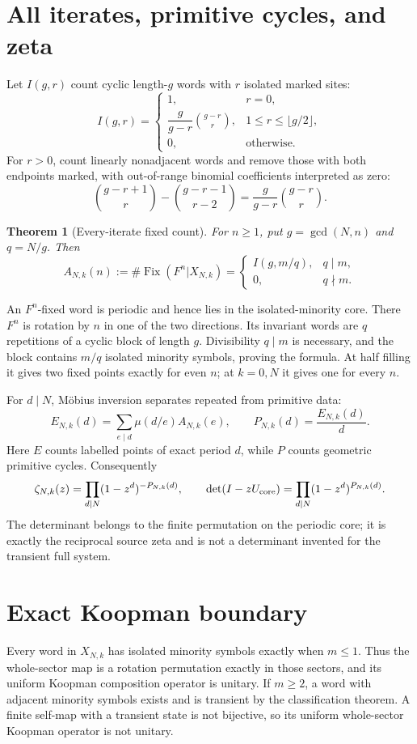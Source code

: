 \documentclass[10pt]{article}
\newtheorem{theorem}{Theorem}
\begin{document}
\section{All iterates, primitive cycles, and zeta}
Let $I(g,r)$ count cyclic length-$g$ words with $r$ isolated marked sites:
\[
I(g,r)=
\begin{cases}
1,&r=0,\\[1mm]
\dfrac{g}{g-r}\binom{g-r}{r},&1\le r\le\lfloor g/2\rfloor,\\[1mm]
0,&\text{otherwise}.
\end{cases}
\]
For $r>0$, count linearly nonadjacent words and remove those with both
endpoints marked, with out-of-range binomial coefficients interpreted as zero:
\[
\binom{g-r+1}{r}-\binom{g-r-1}{r-2}
=\frac{g}{g-r}\binom{g-r}{r}.
\]

\begin{theorem}[Every-iterate fixed count]
For $n\ge1$, put $g=\gcd(N,n)$ and $q=N/g$. Then
\[
A_{N,k}(n):=\#\operatorname{Fix}(F^n|X_{N,k})=
\begin{cases}
I(g,m/q),&q\mid m,\\
0,&q\nmid m.
\end{cases}
\]
\end{theorem}
An $F^n$-fixed word is periodic and hence lies in the isolated-minority core.
There $F^n$ is rotation by $n$ in one of the two directions. Its invariant
words are $q$ repetitions of a cyclic block of length $g$. Divisibility
$q\mid m$ is necessary, and the block contains $m/q$ isolated minority
symbols, proving the formula. At half filling it gives two fixed points
exactly for even $n$; at $k=0,N$ it gives one for every $n$.

For $d\mid N$, Möbius inversion separates repeated from primitive data:
\[
E_{N,k}(d)=\sum_{e\mid d}\mu(d/e)A_{N,k}(e),\qquad
P_{N,k}(d)=\frac{E_{N,k}(d)}d.
\]
Here $E$ counts labelled points of exact period $d$, while $P$ counts
geometric primitive cycles. Consequently
\[
\zeta_{N,k}(z)=\prod_{d\mid N}(1-z^d)^{-P_{N,k}(d)},\qquad
\det(I-zU_{\rm core})=\prod_{d\mid N}(1-z^d)^{P_{N,k}(d)}.
\]
The determinant belongs to the finite permutation on the periodic core; it
is exactly the reciprocal source zeta and is not a determinant invented for
the transient full system.

\section{Exact Koopman boundary}
Every word in $X_{N,k}$ has isolated minority symbols exactly when $m\le1$.
Thus the whole-sector map is a rotation permutation exactly in those sectors,
and its uniform Koopman composition operator is unitary. If $m\ge2$, a word
with adjacent minority symbols exists and is transient by the classification
theorem. A finite self-map with a transient state is not bijective, so its
uniform whole-sector Koopman operator is not unitary.
\end{document}
